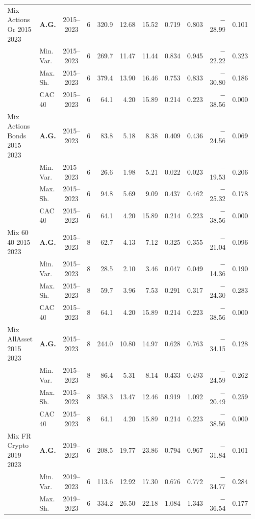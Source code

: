 \begin{longtable}{p{2.6cm} l c c r r r r r r r}
\midrule
Mix Actions Or 2015 2023 & \textbf{A.G.} & 2015--2023 & 6 & 320.9 & 12.68 & 15.52 & 0.719 & 0.803 & $-$28.99 & 0.101 \\
 & Min.\,Var. & 2015--2023 & 6 & 269.7 & 11.47 & 11.44 & 0.834 & 0.945 & $-$22.22 & 0.323 \\
 & Max.\,Sh. & 2015--2023 & 6 & 379.4 & 13.90 & 16.46 & 0.753 & 0.833 & $-$30.80 & 0.186 \\
 & CAC 40 & 2015--2023 & 6 & 64.1 & 4.20 & 15.89 & 0.214 & 0.223 & $-$38.56 & 0.000 \\
\midrule
Mix Actions Bonds 2015 2023 & \textbf{A.G.} & 2015--2023 & 6 & 83.8 & 5.18 & 8.38 & 0.409 & 0.436 & $-$24.56 & 0.069 \\
 & Min.\,Var. & 2015--2023 & 6 & 26.6 & 1.98 & 5.21 & 0.022 & 0.023 & $-$19.53 & 0.206 \\
 & Max.\,Sh. & 2015--2023 & 6 & 94.8 & 5.69 & 9.09 & 0.437 & 0.462 & $-$25.32 & 0.178 \\
 & CAC 40 & 2015--2023 & 6 & 64.1 & 4.20 & 15.89 & 0.214 & 0.223 & $-$38.56 & 0.000 \\
\midrule
Mix 60 40 2015 2023 & \textbf{A.G.} & 2015--2023 & 8 & 62.7 & 4.13 & 7.12 & 0.325 & 0.355 & $-$21.04 & 0.096 \\
 & Min.\,Var. & 2015--2023 & 8 & 28.5 & 2.10 & 3.46 & 0.047 & 0.049 & $-$14.36 & 0.190 \\
 & Max.\,Sh. & 2015--2023 & 8 & 59.7 & 3.96 & 7.53 & 0.291 & 0.317 & $-$24.30 & 0.283 \\
 & CAC 40 & 2015--2023 & 8 & 64.1 & 4.20 & 15.89 & 0.214 & 0.223 & $-$38.56 & 0.000 \\
\midrule
Mix AllAsset 2015 2023 & \textbf{A.G.} & 2015--2023 & 8 & 244.0 & 10.80 & 14.97 & 0.628 & 0.763 & $-$34.15 & 0.128 \\
 & Min.\,Var. & 2015--2023 & 8 & 86.4 & 5.31 & 8.14 & 0.433 & 0.493 & $-$24.59 & 0.262 \\
 & Max.\,Sh. & 2015--2023 & 8 & 358.3 & 13.47 & 12.46 & 0.919 & 1.092 & $-$20.49 & 0.259 \\
 & CAC 40 & 2015--2023 & 8 & 64.1 & 4.20 & 15.89 & 0.214 & 0.223 & $-$38.56 & 0.000 \\
\midrule
Mix FR Crypto 2019 2023 & \textbf{A.G.} & 2019--2023 & 6 & 208.5 & 19.77 & 23.86 & 0.794 & 0.967 & $-$31.84 & 0.101 \\
 & Min.\,Var. & 2019--2023 & 6 & 113.6 & 12.92 & 17.30 & 0.676 & 0.772 & $-$34.77 & 0.284 \\
 & Max.\,Sh. & 2019--2023 & 6 & 334.2 & 26.50 & 22.18 & 1.084 & 1.343 & $-$36.54 & 0.177 \\

\end{longtable}
